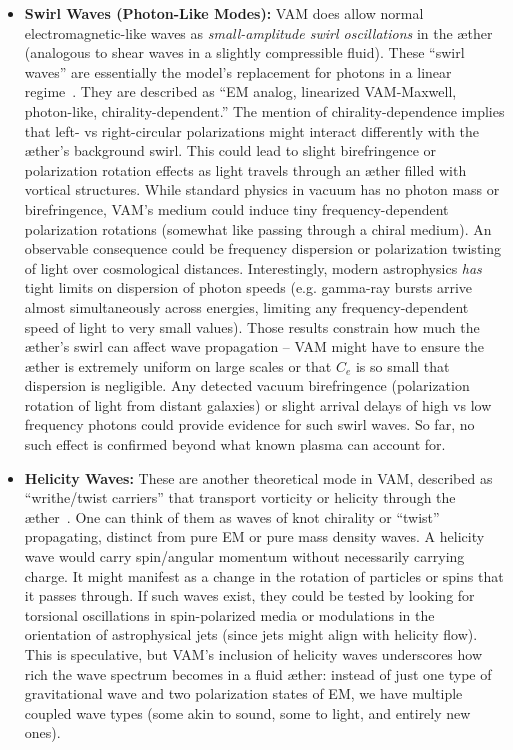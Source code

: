 \documentclass[a4paper,12pt]{article}
\begin{document}
\begin{itemize}
\item 
\textbf{Swirl Waves (Photon-Like Modes):} VAM does allow normal electromagnetic-like waves as \textit{small-amplitude swirl oscillations} in the æther (analogous to shear waves in a slightly compressible fluid). These “swirl waves” are essentially the model’s replacement for photons in a linear regime~\cite{vamcore}. They are described as “EM analog, linearized VAM-Maxwell, photon-like, chirality-dependent.” The mention of chirality-dependence implies that left- vs right-circular polarizations might interact differently with the æther’s background swirl. This could lead to slight birefringence or polarization rotation effects as light travels through an æther filled with vortical structures. While standard physics in vacuum has no photon mass or birefringence, VAM’s medium could induce tiny frequency-dependent polarization rotations (somewhat like passing through a chiral medium). An observable consequence could be frequency dispersion or polarization twisting of light over cosmological distances. Interestingly, modern astrophysics \textit{has} tight limits on dispersion of photon speeds (e.g. gamma-ray bursts arrive almost simultaneously across energies, limiting any frequency-dependent speed of light to very small values). Those results constrain how much the æther’s swirl can affect wave propagation – VAM might have to ensure the æther is extremely uniform on large scales or that $C_e$ is so small that dispersion is negligible. Any detected vacuum birefringence (polarization rotation of light from distant galaxies) or slight arrival delays of high vs low frequency photons could provide evidence for such swirl waves. So far, no such effect is confirmed beyond what known plasma can account for.

\item 
\textbf{Helicity Waves:} These are another theoretical mode in VAM, described as “writhe/twist carriers” that transport vorticity or helicity through the æther~\cite{vamcore}. One can think of them as waves of knot chirality or “twist” propagating, distinct from pure EM or pure mass density waves. A helicity wave would carry spin/angular momentum without necessarily carrying charge. It might manifest as a change in the rotation of particles or spins that it passes through. If such waves exist, they could be tested by looking for torsional oscillations in spin-polarized media or modulations in the orientation of astrophysical jets (since jets might align with helicity flow). This is speculative, but VAM’s inclusion of helicity waves underscores how rich the wave spectrum becomes in a fluid æther: instead of just one type of gravitational wave and two polarization states of EM, we have multiple coupled wave types (some akin to sound, some to light, and entirely new ones).

\end{itemize}
\end{document}
